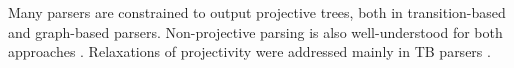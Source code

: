 Many parsers are constrained to output projective trees, both in transition-based \cite{nivre_efficient_2003,covington_fundamental_2001} and graph-based \cite{zhang_dependency_2016,kiperwasser_simple_2016} parsers. Non-projective parsing is also well-understood for both approaches \cite{nivre_non-projective_2009,mcdonald_non-projective_2005}. Relaxations of projectivity were addressed mainly in TB parsers \cite{nivre_pseudo-projective_2005,nivre_constraints_2006,gomez-rodriguez_transition-based_2010,gomez-rodriguez_parsing_2009}.



